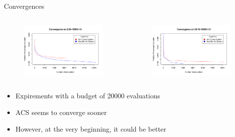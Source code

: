 \documentclass{beamer}
\begin{document}
\begin{frame}{Convergences}

    \begin{columns}[t]

        \begin{column}{0.5\textwidth}
            \begin{figure}
                \centering
                \includegraphics[scale=0.31]{conv-2-30}
            \end{figure}
        \end{column}

        \begin{column}{0.5\textwidth}
            \begin{figure}
                \centering
                \includegraphics[scale=0.31]{conv-20-10}
            \end{figure}
        \end{column}

    \end{columns}

    \begin{itemize}
        \item Expirements with a budget of 20000 evaluations
        \item ACS seems to converge sooner
        \item However, at the very beginning, it could be better
    \end{itemize}

\end{frame}
\end{document}
